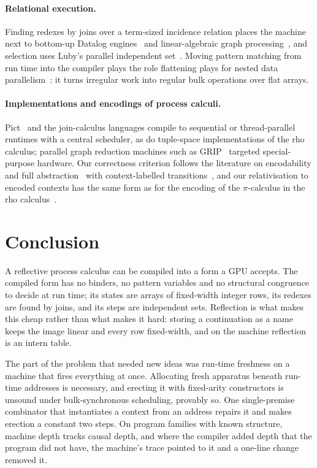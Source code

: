 \documentclass[acmsmall,screen,review,anonymous]{acmart}
\begin{document}
\paragraph{Relational execution.}
Finding redexes by joins over a term-sized incidence relation places the
machine next to bottom-up Datalog engines~\cite{Souffle16} and linear-algebraic
graph processing~\cite{GraphBLAS11}, and selection uses Luby's parallel
independent set~\cite{Luby86}. Moving pattern matching from run time into the
compiler plays the role flattening plays for nested data
parallelism~\cite{Blelloch96}: it turns irregular work into regular bulk
operations over flat arrays.

\paragraph{Implementations and encodings of process calculi.}
Pict~\cite{PierceTurner00} and the join-calculus languages compile to
sequential or thread-parallel runtimes with a central scheduler, as do
tuple-space implementations of the rho calculus; parallel graph reduction
machines such as GRIP~\cite{GRIP87} targeted special-purpose hardware. Our
correctness criterion follows the literature on encodability and full
abstraction~\cite{Milner92,Gorla10,SangiorgiWalker01} with context-labelled
transitions~\cite{Sewell98,LeiferMilner00}, and our relativisation to encoded
contexts has the same form as for the encoding of the $\pi$-calculus in the
rho calculus~\cite{Lybech22,AnonNowns}.

\section{Conclusion}
\label{sec:conclusion}

A reflective process calculus can be compiled into a form a GPU accepts. The
compiled form has no binders, no pattern variables and no structural
congruence to decide at run time; its states are arrays of fixed-width
integer rows, its redexes are found by joins, and its steps are independent
sets. Reflection is what makes this cheap rather than what makes it hard:
storing a continuation as a name keeps the image linear and every row
fixed-width, and on the machine reflection is an intern table.

The part of the problem that needed new ideas was run-time freshness on a
machine that fires everything at once. Allocating fresh apparatus beneath
run-time addresses is necessary, and erecting it with fixed-arity constructors
is unsound under bulk-synchronous scheduling, provably so. One single-premise
combinator that instantiates a context from an address repairs it and makes
erection a constant two steps. On program families with known structure,
machine depth tracks causal depth, and where the compiler added depth that
the program did not have, the machine's trace pointed to it and a one-line
change removed it.
\end{document}
